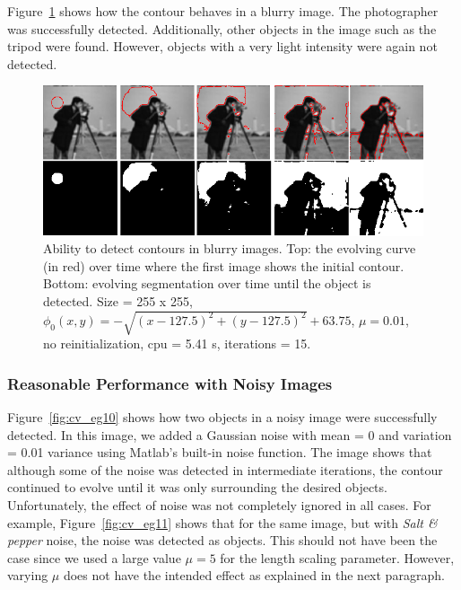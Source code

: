 \documentclass[10pt,twocolumn,letterpaper]{article}
\begin{document}
Figure~\ref{fig:cv_eg9} shows how the contour behaves in a blurry image. The photographer was successfully detected. Additionally, other objects in the image
such as the tripod were found. However, objects with a very light intensity were again not detected.

\begin{figure}[t!]
\centering
\includegraphics[width=12cm]{cv_eg9.png}
\caption{Ability to detect contours in blurry images.  Top: the evolving curve (in red) over time where the first
image shows the initial
contour. Bottom: evolving segmentation over time until the object is detected. Size = 255 x 255, $\phi_{0}(x,y) = - \sqrt{(x - 127.5)^2 + (y - 127.5)^2} +
63.75$, $\mu =0.01$, no reinitialization, cpu = 5.41 s, iterations = 15.}
\label{fig:cv_eg9}
\end{figure}

\subsubsection*{Reasonable Performance with Noisy Images}


Figure~\ref{fig:cv_eg10} shows how two objects in a noisy image were successfully detected. In this image, we added a Gaussian noise with mean = 0 and
variation = 0.01
variance using Matlab's built-in noise function. The image shows that although some of the noise was detected in intermediate iterations, the contour continued
to evolve until it was only surrounding the desired objects. Unfortunately, the effect of noise was not completely ignored in all cases. For example,
Figure~\ref{fig:cv_eg11} shows that for the same image, but with \textit{Salt \& pepper} noise, the noise was detected as objects. This should not have been the
case
since we used a large value $\mu = 5$ for the length scaling parameter. However, varying $\mu$ does not have the intended effect as explained
in the next paragraph. 
\end{document}
